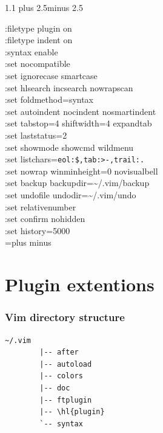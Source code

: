 \documentclass[14pt,svgnames,compress]{beamer}
\newcommand\hl[1]{\textcolor{HlColor}{#1}}
\newcommand\frametitlefontsize{\Huge}
\newcommand\singleframetitle[1]{
    \begin{center}
        \frametitlefontsize #1
    \end{center}
}
\newcommand\titleframe{
    \begin{frame}
        \singleframetitle{\insertsectionhead}
    \end{frame}
}
\newenvironment{wspacing}[1]
{
    \spaceskip=#1\fontdimen2\font plus #1\fontdimen3\font minus #1\fontdimen4\font
}
{
    \spaceskip=\fontdimen2\font plus \fontdimen3\font minus \fontdimen4\font
}
\begin{document}
\begin{frame}[fragile]
    \begin{spacing}{1.1} %
        \begin{wspacing}{2.5}
            \footnotesize
            :\hl{filetype plugin} on \\
            :\hl{filetype indent} on \\
            :\hl{syntax} enable \\
            :set \hl{nocompatible} \\
            :set \hl{ignorecase smartcase} \\
            :set \hl{hlsearch incsearch nowrapscan} \\
            :set \hl{foldmethod}=syntax \\
            :set \hl{autoindent nocindent nosmartindent} \\
            :set \hl{tabstop}=4 \hl{shiftwidth}=4 \hl{expandtab} \\
            :set \hl{laststatus}=2 \\
            :set \hl{showmode showcmd wildmenu} \\
            :set \hl{listchars}=\verb|eol:$,tab:>-,trail:.| \\
            :set \hl{nowrap winminheight}=0 \hl{novisualbell} \\
            :set \hl{backup backupdir}=\textasciitilde{}/.vim/backup \\
            :set \hl{undofile undodir}=\textasciitilde{}/.vim/undo \\
            :set \hl{relativenumber} \\
            :set \hl{confirm nohidden} \\
            :set \hl{history}=5000 \\
        \end{wspacing}
    \end{spacing}
\end{frame}


\section{Plugin extentions}

\titleframe

\begin{frame}[fragile]
    \frametitle{Vim directory structure}
    \begin{Verbatim}[gobble=4,commandchars=\\\{\}]
       ~/.vim
        |-- after
        |-- autoload
        |-- colors
        |-- doc
        |-- ftplugin
        |-- \hl{plugin}
        `-- syntax
    \end{Verbatim}
\end{frame}
\end{document}
